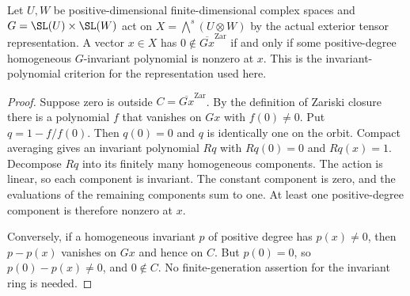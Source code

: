 \begin{lemma}
\label{lem:invariant-orbit-criterion}
\leanok
{}
Let $U,W$ be positive-dimensional finite-dimensional complex spaces and
$G=\SL(U)\times\SL(W)$ act on $X=\bigwedge^s(U\otimes W)$ by the
actual exterior tensor representation. A vector $x\in X$ has $0\notin\overline{Gx}^{\mathrm{Zar}}$ if and only if some
positive-degree homogeneous $G$-invariant polynomial is nonzero at $x$.
This is the invariant-polynomial criterion for the representation used here.
\end{lemma}
\begin{proof}
Suppose zero is outside $C=\overline{Gx}^{\mathrm{Zar}}$.
By the definition of Zariski closure there is a polynomial $f$ that
vanishes on $Gx$ with $f(0)\ne0$. Put $q=1-f/f(0)$.
Then $q(0)=0$ and $q$ is identically one on the orbit. Compact
averaging gives an invariant polynomial $Rq$ with $Rq(0)=0$ and
$Rq(x)=1$. Decompose $Rq$ into its finitely many homogeneous
components. The action is linear, so each component is invariant.
The constant component is zero, and the evaluations of the remaining
components sum to one. At least one positive-degree component is
therefore nonzero at $x$.

Conversely, if a homogeneous invariant $p$ of positive degree has
$p(x)\ne0$, then $p-p(x)$ vanishes on $Gx$ and hence on $C$.
But $p(0)=0$, so $p(0)-p(x)\ne0$, and $0\notin C$.
No finite-generation assertion for the invariant ring is needed.
\end{proof}

